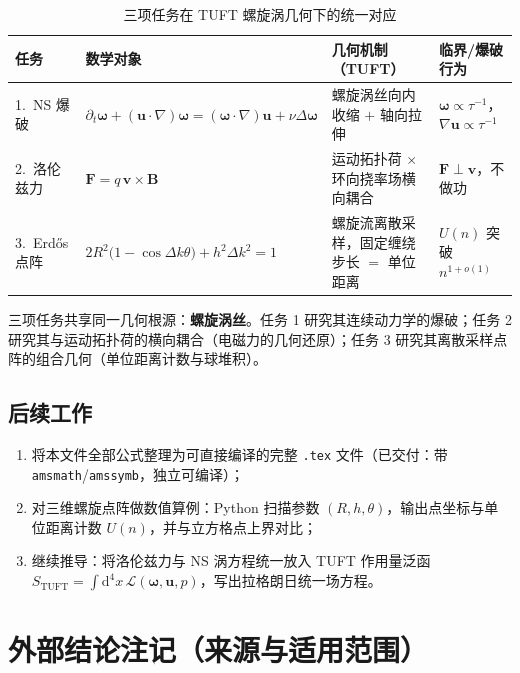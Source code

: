 \documentclass[11pt,a4paper]{article}
\newcommand{\dd}{\mathrm{d}}
\newcommand{\bu}{\bm{u}}
\newcommand{\bom}{\bm{\omega}}
\newcommand{\bF}{\bm{F}}
\newcommand{\bB}{\bm{B}}
\newcommand{\bv}{\bm{v}}
\theoremstyle{remark}
\begin{document}
\begin{table}[h]
\centering
\caption{三项任务在 TUFT 螺旋涡几何下的统一对应}
\begin{tabular}{@{}llll@{}}
\toprule
任务 & 数学对象 & 几何机制（TUFT） & 临界/爆破行为 \\
\midrule
1.~NS 爆破 & $\partial_t\bom+(\bu\cdot\nabla)\bom=(\bom\cdot\nabla)\bu+\nu\Delta\bom$ & 螺旋涡丝向内收缩 $+$ 轴向拉伸 & $\bom\propto\tau^{-1}$，$\nabla\bu\propto\tau^{-1}$ \\
2.~洛伦兹力 & $\bF=q\,\bv\times\bB$ & 运动拓扑荷 $\times$ 环向挠率场横向耦合 & $\bF\perp\bv$，不做功 \\
3.~Erd\H{o}s 点阵 & $2R^{2}\bigl(1-\cos\Delta k\theta\bigr)+h^{2}\Delta k^{2}=1$ & 螺旋流离散采样，固定缠绕步长 $=$ 单位距离 & $U(n)$ 突破 $n^{1+o(1)}$ \\
\bottomrule
\end{tabular}
\end{table}

三项任务共享同一几何根源：\textbf{螺旋涡丝}。任务 1 研究其连续动力学的爆破；任务 2 研究其与运动拓扑荷的横向耦合（电磁力的几何还原）；任务 3 研究其离散采样点阵的组合几何（单位距离计数与球堆积）。

\subsection{后续工作}

\begin{enumerate}[label=\textbf{\Alph*.}]
\item 将本文件全部公式整理为可直接编译的完整 \texttt{.tex} 文件（已交付：带 \texttt{amsmath}/\texttt{amssymb}，独立可编译）；
\item 对三维螺旋点阵做数值算例：Python 扫描参数 $(R,h,\theta)$，输出点坐标与单位距离计数 $U(n)$，并与立方格点上界对比；
\item 继续推导：将洛伦兹力与 NS 涡方程统一放入 TUFT 作用量泛函 $S_{\mathrm{TUFT}}=\int\dd^{4}x\,\mathcal{L}(\bom,\bu,p)$，写出拉格朗日统一场方程。
\end{enumerate}

\section{外部结论注记（来源与适用范围）}
\label{sec:ext}
\end{document}
